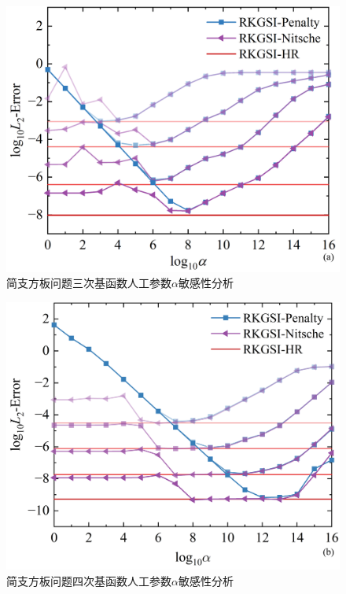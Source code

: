 \begin{figure}[H]
    \centering
    \includegraphics[scale=0.5]{figure/PHR/R/calpha.png}
    \caption{简支方板问题三次基函数人工参数$\alpha$敏感性分析}\label{calpha}
\end{figure}
\newpage
\begin{figure}[H]
    \centering
    \includegraphics[scale=0.5]{figure/PHR/R/qalpha.png}
    \caption{简支方板问题四次基函数人工参数$\alpha$敏感性分析}\label{qalpha}
\end{figure}

